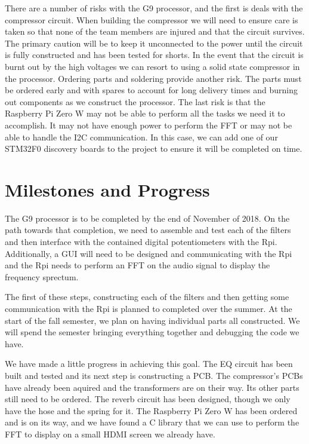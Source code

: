 \documentclass[journal]{IEEEtran}
\begin{document}
	There are a number of risks with the G9 processor, and the first is deals with the compressor circuit.  When building the compressor we will need to ensure care is taken so that none of the team members are injured and that the circuit survives.  The primary caution will be to keep it unconnected to the power until the circuit is fully constructed and has been tested for shorts.  In the event that the circuit is burnt out by the high voltages we can resort to using a solid state compressor in the processor.  Ordering parts and soldering provide another risk.  The parts must be ordered early and with spares to account for long delivery times and burning out components as we construct the processor.  The last risk is that the Raspberry Pi Zero W may not be able to perform all the tasks we need it to accomplish.  It may not have enough power to perform the FFT or may not be able to handle the I2C communication.  In this case, we can add one of our STM32F0 discovery boards to the project to ensure it will be completed on time.
	
	\section{Milestones and Progress}
	The G9 processor is to be completed by the end of November of 2018.  On the path towards that completion, we need to assemble and test each of the filters and then interface with the contained digital potentiometers with the Rpi.  Additionally, a GUI will need to be designed and communicating with the Rpi and the Rpi needs to perform an FFT on the audio signal to display the frequency sprectum.  
	
	The first of these steps, constructing each of the filters and then getting some communication with the Rpi is planned to completed over the summer.  At the start of the fall semester, we plan on having individual parts all constructed.  We will spend the semester bringing everything together and debugging the code we have.
	
	We have made a little progress in achieving this goal.  The EQ circuit has been built and tested and its next step is constructing a PCB.  The compressor's PCBs have already been aquired and the transformers are on their way.  Its other parts still need to be ordered.  The reverb circuit has been designed, though we only have the hose and the spring for it.  The Raspberry Pi Zero W has been ordered and is on its way, and we have found a C library that we can use to perform the FFT to display on a small HDMI screen we already have.
	
\end{document}
